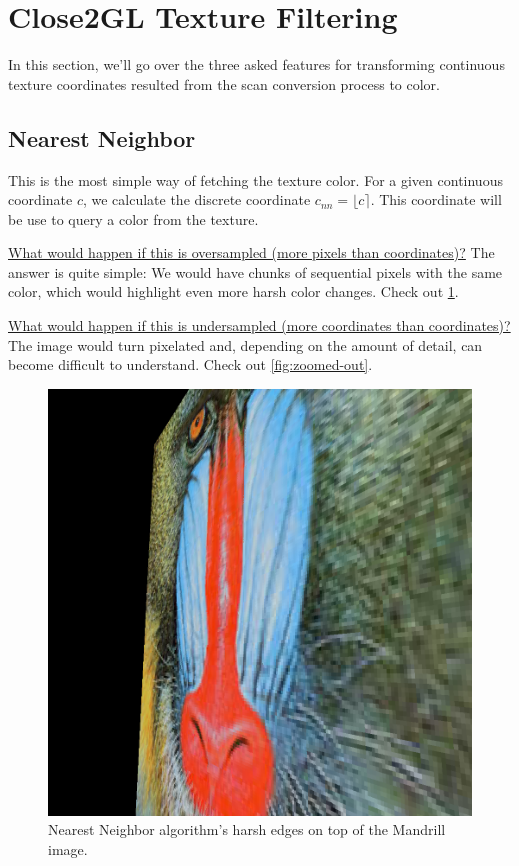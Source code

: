 \documentclass[twocolumn, 12pt]{article}
\newcommand{\round}[1]{\ensuremath{\lfloor#1\rceil}}
\begin{document}
\section{Close2GL Texture Filtering}
\label{sec:orgd1a79ae}

In this section, we'll go over the three asked features for
transforming continuous texture coordinates resulted from the scan
conversion process to color.

\subsection{Nearest Neighbor}
\label{sec:org43ac155}

This is the most simple way of fetching the texture color. For a
given continuous coordinate \(c\), we calculate the discrete
coordinate \(c_{nn} = \round{c}\). This coordinate will be use to
query a color from the texture.

\uline{What would happen if this is oversampled (more pixels than
coordinates)?} The answer is quite simple: We would have chunks of
sequential pixels with the same color, which would highlight even
more harsh color changes. Check out \cref{fig:NN}.

\uline{What would happen if this is undersampled (more coordinates than
coordinates)?} The image would turn pixelated and, depending on the
amount of detail, can become difficult to understand. Check out \cref{fig:zoomed-out}.

\begin{figure}[htbp]
\centering
\includegraphics[width=\linewidth]{./res/NN-mandrill.png}
\caption{\label{fig:NN}Nearest Neighbor algorithm's harsh edges on top of the Mandrill image.}
\end{figure}
\end{document}
